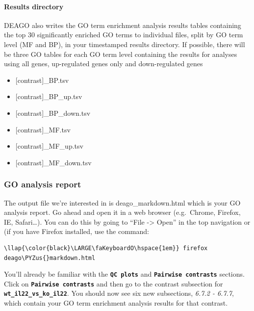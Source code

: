 \documentclass[11pt]{article}
\providecommand{\tightlist}{%
      \setlength{\itemsep}{0pt}\setlength{\parskip}{0pt}}
\def\PYZus{\char`\_}
\begin{document}
\hypertarget{results-directory}{%
\paragraph{Results directory}\label{results-directory}}

DEAGO also writes the GO term enrichment analysis results tables
containing the top 30 significantly enriched GO terms to individual
files, split by GO term level (MF and BP), in your timestamped results
directory. If possible, there will be three GO tables for each GO term
level containing the results for analyses using all genes, up-regulated
genes only and down-regulated genes

\begin{itemize}
\tightlist
\item
  {[}contrast{]}\_BP.tsv
\item
  {[}contrast{]}\_BP\_up.tsv
\item
  {[}contrast{]}\_BP\_down.tsv
\item
  {[}contrast{]}\_MF.tsv
\item
  {[}contrast{]}\_MF\_up.tsv
\item
  {[}contrast{]}\_MF\_down.tsv
\end{itemize}

\hypertarget{go-analysis-report}{%
\subsubsection{GO analysis report}\label{go-analysis-report}}

The output file we're interested in is deago\_markdown.html which is
your GO analysis report. Go ahead and open it in a web browser
(e.g.~Chrome, Firefox, IE, Safari\ldots{}). You can do this by going to
``File -\textgreater{} Open'' in the top navigation or (if you have
Firefox installed, use the command:

\begin{terminalinput}
\begin{Verbatim}[commandchars=\\\{\}]
\llap{\color{black}\LARGE\faKeyboardO\hspace{1em}} firefox deago\PYZus{}markdown.html
\end{Verbatim}
\end{terminalinput}

    You'll already be familiar with the \textbf{\texttt{QC\ plots}} and
\textbf{\texttt{Pairwise\ contrasts}} sections. Click on
\textbf{\texttt{Pairwise\ contrasts}} and then go to the contrast
subsection for \textbf{\texttt{wt\_il22\_vs\_ko\_il22}}. You should now
see six new subsections, \textit{6.7.2 - 6.7.7}, which contain your GO
term enrichment analysis results for that contrast.
\end{document}
